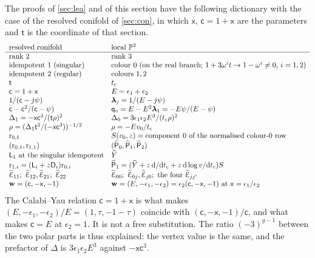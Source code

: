 \begin{rmk}
\label{rmk:reg-dict}
The proofs of \cref{sec:lea} and of this section have the following dictionary with the case of the resolved conifold of \cref{sec:con}, in which $\mathsf{x}$, $\mathsf{c}=1+\mathsf{x}$ are the parameters and $\mathsf{t}$ is the coordinate of that section.
\[
\begin{array}{ll}
\text{resolved conifold} & \text{local }\bbP^2\\
\hline
\text{rank }2 & \text{rank }3\\
\text{idempotent }1\text{ (singular)} & \text{colour }0\text{ (on the real branch; }1+3\omega^it\to 1-\omega^i\neq 0\text{, }i=1,2)\\
\text{idempotent }2\text{ (regular)} & \text{colours }1,2\\
\mathsf{t} & \tc\\
\mathsf{c}=1+\mathsf{x} & E=\epsilon_1+\epsilon_2\\
1/(\mathsf{c}-j\psi) & \lf_j=1/(E-j\psi)\\
\mathsf{c}-\mathsf{c}^2/(\mathsf{c}-\psi) & \qo=E-E^2\lf_1=-E\psi/(E-\psi)\\
\Delta_1=-\mathsf{x}\mathsf{c}^3/(\mathsf{t}\rho)^2 & \Delta_0=3\epsilon_1\epsilon_2E^3/(\tc\rho)^2\\
\rho=(\Delta_1\mathsf{t}^2/(-\mathsf{x}\mathsf{c}^3))^{-1/2} & \rho=-Ev_0/\tc\\
\mathrm{r}_{0,1} & \Srow(v_0,z)=\text{component }0\text{ of the normalised colour-}0\text{ row}\\
(\mathrm{r}_{0,1},\mathrm{r}_{1,1}) & (\Ph_0,\Ph_1,\Ph_2)\\
\mathsf{L}_1\text{ at the singular idempotent} & \Yh\\
\mathrm{r}_{1,i}=(\mathsf{L}_i+z\mathsf{D}_i)\mathrm{r}_{0,i} & \Ph_1=(\Yh+z\,\dd/\dd\tc+z\,\dd\log v/\dd\tc)\Srow\\
\Edgeh_{11};\ \Edgeh_{12},\Edgeh_{21};\ \Edgeh_{22} & \Edgeh_{00};\ \Edgeh_{0j},\Edgeh_{j0};\ \text{the four }\Edgeh_{jj'}\\
\bw=(\mathsf{c},-\mathsf{x},-1) & \bw=(E,-\epsilon_1,-\epsilon_2)=\epsilon_2(\mathsf{c},-\mathsf{x},-1)\text{ at }\mathsf{x}=\epsilon_1/\epsilon_2
\end{array}
\]
The Calabi--Yau relation $\mathsf{c}=1+\mathsf{x}$ is what makes $(E,-\epsilon_1,-\epsilon_2)/E=(1,\tau,-1-\tau)$ coincide with $(\mathsf{c},-\mathsf{x},-1)/\mathsf{c}$, and what makes $\mathsf{c}=E$ at $\epsilon_2=1$. It is not a free substitution. The ratio $(-3)^{g-1}$ between the two polar parts is thus explained: the vertex value is the same, and the prefactor of $\Delta$ is $3\epsilon_1\epsilon_2E^3$ against $-\mathsf{x}\mathsf{c}^3$.
\end{rmk}
